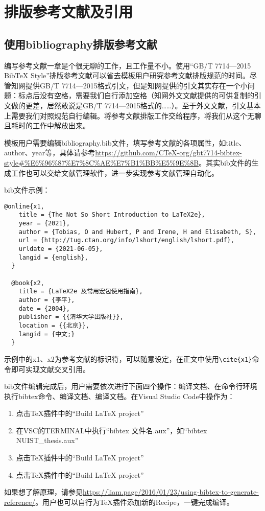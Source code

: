 \section{排版参考文献及引用}
\subsection{使用bibliography排版参考文献}
编写参考文献一章是个很无聊的工作，且工作量不小。使用“GB/T 7714—2015 BibTeX Style”排版参考文献可以省去模板用户研究参考文献排版规范的时间。尽管知网提供GB/T 7714—2015格式引文，但是知网提供的引文其实存在一个小问题：标点后没有空格，需要我们自行添加空格（知网外文文献提供的可供复制的引文做的更差，居然敢说是GB/T 7714—2015格式的……）。至于外文文献，引文基本上需要我们对照规范自行编辑。将参考文献排版工作交给程序，将我们从这个无聊且耗时的工作中解放出来。

模板用户需要编辑bibliography.bib文件，填写参考文献的各项属性，如title、author、year等，具体请参考\url{https://github.com/CTeX-org/gbt7714-bibtex-style#%E6%96%87%E7%8C%AE%E7%B1%BB%E5%9E%8B}。其实bib文件的生成工作也可以交给文献管理软件，进一步实现参考文献管理自动化。

bib文件示例：
{\color{green!50!black}
\begin{lstlisting}[breaklines=true,]
    @online{x1,
    title = {The Not So Short Introduction to LaTeX2e},
    year = {2021},
    author = {Tobias, O and Hubert, P and Irene, H and Elisabeth, S},
    url = {http://tug.ctan.org/info/lshort/english/lshort.pdf},
    urldate = {2021-06-05},
    langid = {english},
  }
  
  @book{x2,
    title = {LaTeX2e 及常用宏包使用指南},
    author = {李平},
    date = {2004},
    publisher = {{清华大学出版社}},
    location = {{北京}},
    langid = {中文;}
  }
\end{lstlisting}
}
示例中的x1、x2为参考文献的标识符，可以随意设定，在正文中使用\verb|\cite{x1}|命令即可实现文献交叉引用。

bib文件编辑完成后，用户需要依次进行下面四个操作：编译文档、在命令行环境执行bibtex命令、编译文档、编译文档。在Visual Studio Code中操作为：
\begin{enumerate}[1、]
    \item 点击\TeX 插件中的“Build LaTeX project”
    \item 在VSC的TERMINAL中执行“bibtex 文件名.aux”，如“bibtex NUIST\_thesis.aux”
    \item 点击\TeX 插件中的“Build LaTeX project”
    \item 点击\TeX 插件中的“Build LaTeX project”
\end{enumerate}
如果想了解原理，请参见\url{https://liam.page/2016/01/23/using-bibtex-to-generate-reference/}。用户也可以自行为\TeX 插件添加新的Recipe，一键完成编译。

